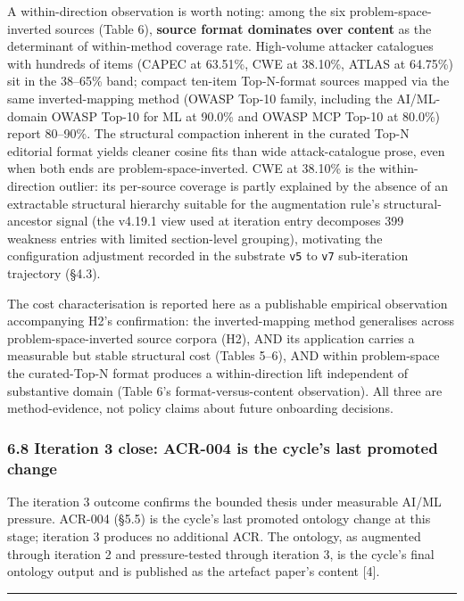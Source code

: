 \documentclass[
]{article}
\begin{document}
A within-direction observation is worth noting: among the six
problem-space-inverted sources (Table 6), \textbf{source format
dominates over content} as the determinant of within-method coverage
rate. High-volume attacker catalogues with hundreds of items (CAPEC at
63.51\%, CWE at 38.10\%, ATLAS at 64.75\%) sit in the 38--65\% band;
compact ten-item Top-N-format sources mapped via the same
inverted-mapping method (OWASP Top-10 family, including the AI/ML-domain
OWASP Top-10 for ML at 90.0\% and OWASP MCP Top-10 at 80.0\%) report
80--90\%. The structural compaction inherent in the curated Top-N
editorial format yields cleaner cosine fits than wide attack-catalogue
prose, even when both ends are problem-space-inverted. CWE at 38.10\% is
the within-direction outlier: its per-source coverage is partly
explained by the absence of an extractable structural hierarchy suitable
for the augmentation rule's structural-ancestor signal (the v4.19.1 view
used at iteration entry decomposes 399 weakness entries with limited
section-level grouping), motivating the configuration adjustment
recorded in the substrate \texttt{v5} to \texttt{v7} sub-iteration
trajectory (§4.3).

The cost characterisation is reported here as a publishable empirical
observation accompanying H2's confirmation: the inverted-mapping method
generalises across problem-space-inverted source corpora (H2), AND its
application carries a measurable but stable structural cost (Tables
5--6), AND within problem-space the curated-Top-N format produces a
within-direction lift independent of substantive domain (Table 6's
format-versus-content observation). All three are method-evidence, not
policy claims about future onboarding decisions.

\subsubsection{6.8 Iteration 3 close: ACR-004 is the cycle's last
promoted
change}\label{iteration-3-close-acr-004-is-the-cycles-last-promoted-change}

The iteration 3 outcome confirms the bounded thesis under measurable
AI/ML pressure. ACR-004 (§5.5) is the cycle's last promoted ontology
change at this stage; iteration 3 produces no additional ACR. The
ontology, as augmented through iteration 2 and pressure-tested through
iteration 3, is the cycle's final ontology output and is published as
the artefact paper's content {[}4{]}.

\begin{center}\rule{0.5\linewidth}{0.5pt}\end{center}
\end{document}
